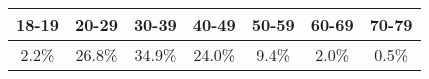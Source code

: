 
\begin{tabular}{c|c|c|c|c|c|c}
\hline
18-19 & 20-29 & 30-39 & 40-49 & 50-59 & 60-69 & 70-79\\
\hline
2.2\% & 26.8\% & 34.9\% & 24.0\% & 9.4\% & 2.0\% & 0.5\%\\
\hline
\end{tabular}
